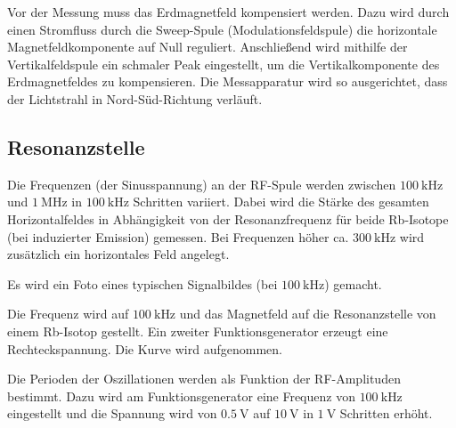 Vor der Messung muss das Erdmagnetfeld kompensiert werden.
Dazu wird durch einen Stromfluss durch die Sweep-Spule (Modulationsfeldspule) die horizontale Magnetfeldkomponente auf Null reguliert. Anschließend wird mithilfe der Vertikalfeldspule ein schmaler Peak eingestellt, um die Vertikalkomponente des Erdmagnetfeldes zu kompensieren. Die Messapparatur wird so ausgerichtet, dass der Lichtstrahl in Nord-Süd-Richtung verläuft. \cite{V21}

\subsection{Resonanzstelle}
Die Frequenzen (der Sinusspannung) an der RF-Spule werden zwischen $\SI{100}{\kilo\hertz}$ und $\SI{1}{\mega\hertz}$ in $\SI{100}{\kilo\hertz}$ Schritten variiert. Dabei wird die Stärke des gesamten Horizontalfeldes in Abhängigkeit von der Resonanzfrequenz für beide Rb-Isotope (bei induzierter Emission) gemessen. Bei Frequenzen höher  ca. $\SI{300}{\kilo\hertz}$ wird zusätzlich ein horizontales Feld angelegt. %


Es wird ein Foto eines typischen Signalbildes (bei $\SI{100}{\kilo\hertz}$) gemacht. %



Die Frequenz wird auf $\SI{100}{\kilo\hertz}$ und das Magnetfeld auf die Resonanzstelle von einem Rb-Isotop gestellt. Ein zweiter Funktionsgenerator erzeugt eine Rechteckspannung. %
Die Kurve wird aufgenommen. %

Die Perioden der Oszillationen werden als Funktion der RF-Amplituden bestimmt. Dazu wird am Funktionsgenerator eine Frequenz von $\SI{100}{\kilo\hertz}$ eingestellt und die Spannung wird von $\SI{0.5}{\volt}$ auf $\SI{10}{\volt}$ in $\SI{1}{\volt}$ Schritten erhöht.
